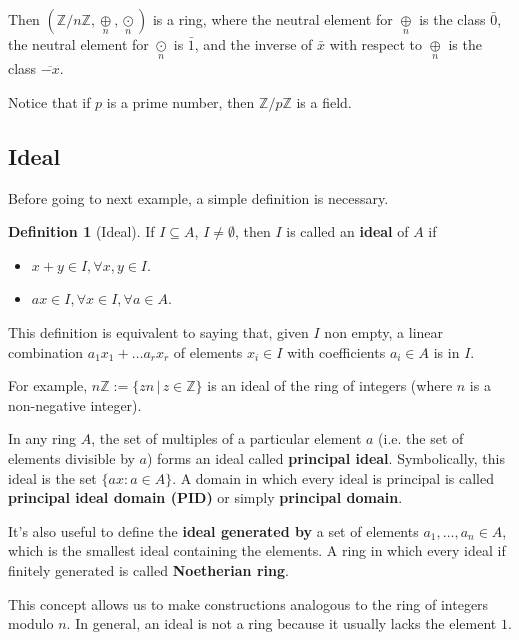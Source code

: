 \documentclass[12pt,a4paper]{article}
\theoremstyle{definition}
\newtheorem{definition}{Definition}[section]
\begin{document}
Then $(\mathbb{Z}/n \mathbb{Z}, \underset{n}{\oplus}, \underset{n}{\odot})$ is a ring, where the neutral element for $\underset{n}{\oplus}$ is the class $\bar{0}$, the neutral element for $\underset{n}{\odot}$ is $\bar{1}$, and the inverse of $\bar{x}$ with respect to $\underset{n}{\oplus}$ is the class $\overline{-x}$.

Notice that if $p$ is a prime number, then $\mathbb{Z} / p\mathbb{Z}$ is a field.

\subsection{Ideal}

Before going to next example, a simple definition is necessary.

\begin{definition}[Ideal]
If \(I \subseteq A\), $I \neq \emptyset$, then \(I\) is called an \textbf{ideal} of \(A\) if
\begin{itemize}
\item
  \(x+y \in I, \forall x, y \in I\).
\item
  \(ax \in I, \forall x \in I, \forall a \in A\).
\end{itemize}
\end{definition}

This definition is equivalent to saying that, given $I$ non empty, a linear combination $a_1x_1 + \ldots a_rx_r$ of elements $x_i \in I$ with coefficients $a_i \in A$ is in $I$.

For example, \(n \mathbb{Z} := \{zn \, | \, z \in \mathbb{Z} \}\) is an ideal of the ring of integers (where \(n\) is a non-negative integer).

In any ring $A$, the set of multiples of a particular element $a$ (i.e. the set of elements divisible by $a$) forms an ideal called \textbf{principal ideal}. Symbolically, this ideal is the set $\{ ax : a \in A \}$. A domain in which every ideal is principal is called \textbf{principal ideal domain (PID)} or simply \textbf{principal domain}.

It's also useful to define the \textbf{ideal generated by} a set of elements $a_1, \ldots, a_n \in A$, which is the smallest ideal containing the elements. A ring in which every ideal if finitely generated is called \textbf{Noetherian ring}.

This concept allows us to make constructions analogous to the ring of integers modulo \(n\). In general, an ideal is not a ring because it usually lacks the element $1$.
\end{document}
